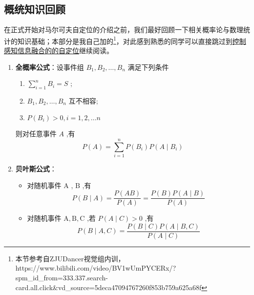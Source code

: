 \documentclass[../main.tex]{subfiles}
\begin{document}
\begin{enumerate}
\subsection*{概统知识回顾}
\hspace{2em}在正式开始对马尔可夫自定位的介绍之前，我们最好回顾一下相关概率论与数理统计的知识基础；本部分是我自己加的\footnote{本节参考自ZJUDancer视觉组内训，https://www.bilibili.com/video/BV1wUmPYCERx/?spm_id_from=333.337.search-card.all.click&vd_source=5deca47094767260f853b759a625a68f}，对此感到熟悉的同学可以直接跳过到\hyperref[sec:markov]{控制感知信息融合的的自定位}继续阅读。
    \begin{enumerate}
        \item \textbf{全概率公式}：设事件组 \( {B}_{1},{B}_{2},\ldots ,{B}_{n} \) 满足下列条件
        \begin{enumerate}
            \item \( \mathop{\sum }\limits_{{i = 1}}^{n}{B}_{i} = S \) ;
            \item \( {B}_{1},{B}_{2},\ldots ,{B}_{n} \) 互不相容;
            \item \( P\left( {B}_{i}\right)  > 0,i = 1,2,\ldots n \)
        \end{enumerate}
        则对任意事件 \( A \) ,有 
        $$ P\left( A\right)  = \mathop{\sum }\limits_{{i = 1}}^{n}P\left( {B}_{i}\right) P\left( {A \mid  {B}_{i}}\right) $$

        \item \textbf{贝叶斯公式}：
        \begin{itemize}
            \item 对随机事件 \( \mathrm{A} \) , \( \mathrm{B} \) ,有
            $$ P\left( {B \mid  A}\right)  = \frac{P\left( {AB}\right) }{P\left( A\right) } = \frac{P\left( B\right) P\left( {A \mid  B}\right) }{P\left( A\right) } $$
            \item 对随机事件 \( \mathrm{A},\mathrm{B},\mathrm{C} \) ,若 \( P\left( {A \mid  C}\right)  > 0 \) ,有
            $$ P\left( {B \mid  A,C}\right)  = \frac{P\left( {B \mid  C}\right) P\left( {A \mid  B,C}\right) }{P\left( {A \mid  C}\right) } $$
        \end{itemize}


\end{enumerate}
\end{enumerate}
\end{document}
